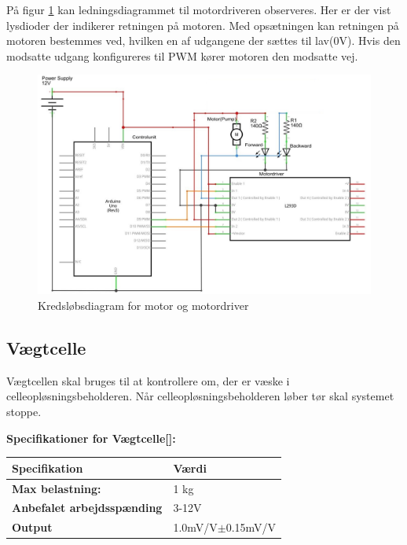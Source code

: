 På figur \ref{fig:motordriverdiagram} kan ledningsdiagrammet til motordriveren observeres. Her er der vist lysdioder der indikerer retningen på motoren. Med opsætningen kan retningen på motoren bestemmes ved, hvilken en af udgangene der sættes til lav(0V). Hvis den modsatte udgang konfigureres til PWM kører motoren den modsatte vej.
 
 \begin{figure}[H]
	\centering
	\includegraphics[width=1\textwidth]{billeder/Hardware/diagrammer/motordiagram.JPG}
	\caption{Kredsløbsdiagram for motor og motordriver}
	\label{fig:motordriverdiagram}
\end{figure}


\subsection{Vægtcelle}
\label{subsec:loadcell}
Vægtcellen skal bruges til at kontrollere om, der er væske i celleopløsningsbeholderen. Når celleopløsningsbeholderen løber tør skal systemet stoppe.

\textbf{Specifikationer for Vægtcelle[\citet{DH7}]:} 
\begin{center}
		\begin{longtable}{ | m{6.5cm} | m{6.5cm}| } 
			\hline
			\textbf{Specifikation} &\textbf{Værdi} \\ 
			\hline
			\textbf{Max belastning:} & 1 kg \\ 
			\hline
			\textbf{Anbefalet arbejdsspænding} & 3-12V \\ 
			\hline
			\textbf{Output} & 1.0mV/V$\pm$0.15mV/V \\ 
			\hline
		\end{longtable}
\end{center}

